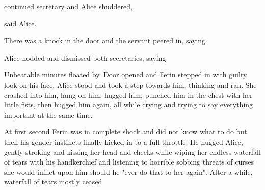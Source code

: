 

 continued secretary and Alice shuddered, 



 said Alice.



There was a knock in the door and the servant peered in, saying 

Alice nodded and dismissed both secretaries, saying 

Unbearable minutes floated by. Door opened and Ferin stepped in with guilty look on his face. Alice stood and took a step towards him, thinking  and ran. She crashed into him, hung on him, hugged him, punched him in the chest with her little fists, then hugged him again, all while crying and trying to say everything important at the same time.

At first second Ferin was in complete shock and did not know what to do but then his gender instincts finally kicked in to a full throttle. He hugged Alice, gently stroking and kissing her head and cheeks while wiping her endless waterfall of tears with his handkerchief and listening to horrible sobbing threats of curses she would inflict upon him should he "ever do that to her again". After a while, waterfall of tears mostly ceased

